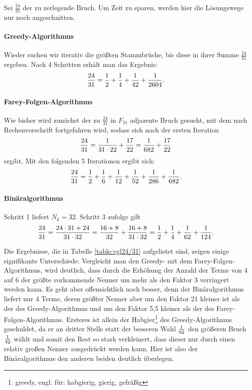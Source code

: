 \vspace{2cm}
\begin{bsp}
	Sei $\frac{24}{31}$ der zu zerlegende Bruch. Um Zeit zu sparen, werden hier die Lösungswege nur noch angeschnitten.
	
	\paragraph{Greedy-Algorithmus} Wieder suchen wir iterativ die größten Stammbrüche, bis diese in ihrer Summe $\frac{24}{31}$ ergeben. Nach 4 Schritten erhält man das Ergebnis:
	$$\frac{24}{31} = \frac{1}{2} + \frac{1}{4} + \frac{1}{42} + \frac{1}{2604}.$$
	
	\paragraph{Farey-Folgen-Algorithmus}Wie bisher wird zunächst der zu $\frac{24}{31}$ in $F_{31}$ adjazente Bruch gesucht, mit dem nach Rechenvorschrift fortgefahren wird, sodass sich nach der ersten Iteration
	$$\frac{24}{31}=\frac{1}{31 \cdot 22}+ \frac{17}{22} = \frac{1}{682} + \frac{17}{22}$$
	ergibt. Mit den folgenden 5 Iterationen ergibt sich:
	$$\frac{24}{31}=\frac{1}{2}+\frac{1}{6}+\frac{1}{12}+\frac{1}{52}+\frac{1}{286}+\frac{1}{682}.$$
	
	\paragraph{Binäralgorithmus}Schritt 1 liefert $N_k = 32$. Schritt 3 zufolge gilt
	$$\frac{24}{31} = \frac{24 \cdot 31 + 24}{31\cdot32} = \frac{16+8}{32} + \frac{16+8}{31 \cdot 32} = \frac{1}{2} + \frac{1}{4} + \frac{1}{62} + \frac{1}{124}.$$
	
	Die Ergebnisse, die in Tabelle \ref{table:vgl24/31} aufgelistet sind, zeigen einige signifikante Unterschiede: Vergleicht man den Greedy- mit dem Farey-Folgen-Algorithmus,  wird deutlich, dass durch die Erhöhung der Anzahl der Terme von 4 auf 6 der größte vorkommende Nenner um mehr als den Faktor 3 verringert werden kann. Es geht aber offensichtlich noch besser, denn der Binäralgorithmus liefert nur 4 Terme, deren größter Nenner aber um den Faktor 21 kleiner ist als der des Greedy-Algorithmus und um den Faktor 5,5 kleiner als der des Farey-Folgen-Algorithmus. Ersteres ist allein der Habgier\footnote{greedy, engl. für: habgierig, gierig, gefräßig} des Greedy-Algorithmus geschuldet, da er an dritter Stelle statt der besseren Wahl $\frac{1}{62}$ den größeren Bruch $\frac{1}{42}$ wählt und somit den Rest so stark verkleinert, dass dieser nur durch einen relativ großen Nenner ausgedrückt werden kann. Hier ist also der Binäralgorithmus den anderen beiden deutlich überlegen.


\end{bsp}
